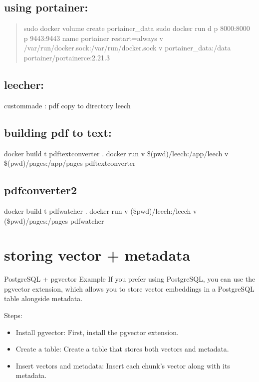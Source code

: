 \documentclass[letterpaper,10pt,english]{sphinxmanual}
\begin{document}
\section{using portainer:}
\label{\detokenize{docker:using-portainer}}\begin{quote}

\sphinxAtStartPar
sudo docker volume create portainer\_data
sudo docker run \sphinxhyphen{}d \sphinxhyphen{}p 8000:8000 \sphinxhyphen{}p 9443:9443 \textendash{}name portainer \textendash{}restart=always \sphinxhyphen{}v /var/run/docker.sock:/var/run/docker.sock \sphinxhyphen{}v portainer\_data:/data portainer/portainer\sphinxhyphen{}ce:2.21.3
\end{quote}


\section{leecher:}
\label{\detokenize{docker:leecher}}
\sphinxAtStartPar
custommade : pdf copy to directory leech


\section{building pdf to text:}
\label{\detokenize{docker:building-pdf-to-text}}
\sphinxAtStartPar
docker build \sphinxhyphen{}t pdf\sphinxhyphen{}text\sphinxhyphen{}converter .
docker run \sphinxhyphen{}v \$(pwd)/leech:/app/leech \sphinxhyphen{}v \$(pwd)/pages:/app/pages pdf\sphinxhyphen{}text\sphinxhyphen{}converter


\section{pdfconverter2}
\label{\detokenize{docker:pdfconverter2}}
\sphinxAtStartPar
docker build \sphinxhyphen{}t pdf\sphinxhyphen{}watcher .
docker run \sphinxhyphen{}v (\$pwd)/leech:/leech \sphinxhyphen{}v (\$pwd)/pages:/pages pdf\sphinxhyphen{}watcher


\chapter{storing vector + metadata}
\label{\detokenize{pgvector:storing-vector-metadata}}\label{\detokenize{pgvector::doc}}
\sphinxAtStartPar
PostgreSQL + pgvector Example
If you prefer using PostgreSQL, you can use the pgvector extension, which allows you to store vector embeddings in a PostgreSQL table alongside metadata.

\sphinxAtStartPar
Steps:
\begin{itemize}
\item {} 
\sphinxAtStartPar
Install pgvector: First, install the pgvector extension.

\item {} 
\sphinxAtStartPar
Create a table: Create a table that stores both vectors and metadata.

\item {} 
\sphinxAtStartPar
Insert vectors and metadata: Insert each chunk’s vector along with its metadata.

\end{itemize}
\end{document}

